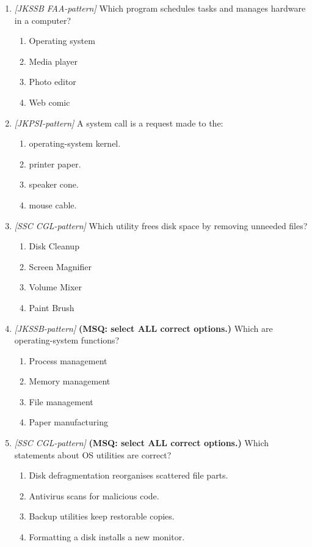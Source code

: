 \documentclass[11pt]{article}
\begin{document}
\begin{enumerate}[label=\textbf{Q\arabic*.}, leftmargin=*]
\item \textit{[JKSSB FAA-pattern]} Which program schedules tasks and manages hardware in a computer?
  \begin{enumerate}[label=\Alph*.]
    \item Operating system
    \item Media player
    \item Photo editor
    \item Web comic
  \end{enumerate}
\item \textit{[JKPSI-pattern]} A system call is a request made to the:
  \begin{enumerate}[label=\Alph*.]
    \item operating-system kernel.
    \item printer paper.
    \item speaker cone.
    \item mouse cable.
  \end{enumerate}
\item \textit{[SSC CGL-pattern]} Which utility frees disk space by removing unneeded files?
  \begin{enumerate}[label=\Alph*.]
    \item Disk Cleanup
    \item Screen Magnifier
    \item Volume Mixer
    \item Paint Brush
  \end{enumerate}
\item \textit{[JKSSB-pattern]} \textbf{(MSQ: select ALL correct options.)} Which are operating-system functions?
  \begin{enumerate}[label=\Alph*.]
    \item Process management
    \item Memory management
    \item File management
    \item Paper manufacturing
  \end{enumerate}
\item \textit{[SSC CGL-pattern]} \textbf{(MSQ: select ALL correct options.)} Which statements about OS utilities are correct?
  \begin{enumerate}[label=\Alph*.]
    \item Disk defragmentation reorganises scattered file parts.
    \item Antivirus scans for malicious code.
    \item Backup utilities keep restorable copies.
    \item Formatting a disk installs a new monitor.
  \end{enumerate}
\end{enumerate}
\def\JKSSBLessonID{52}\def\JKSSBAnswers{0}
\end{document}
